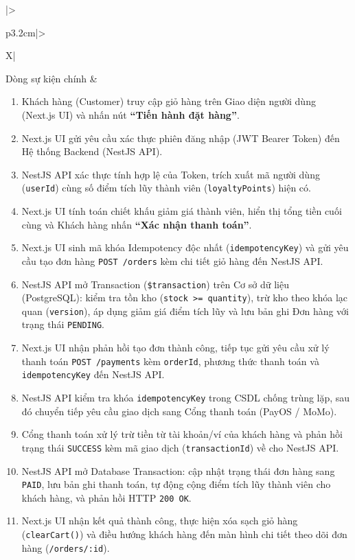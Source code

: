 \documentclass[12pt,a4paper]{article}
\begin{document}
\begin{center}
\begin{xltabular}{\textwidth}{|>{\bfseries\raggedright\arraybackslash}p{3.2cm}|>{\raggedright\arraybackslash}X|}
Dòng sự kiện chính & 
\begin{enumerate}[leftmargin=*,itemsep=2pt,topsep=2pt,parsep=0pt,partopsep=0pt]
    \item Khách hàng (Customer) truy cập giỏ hàng trên Giao diện người dùng (Next.js UI) và nhấn nút \textbf{``Tiến hành đặt hàng''}.
    \item Next.js UI gửi yêu cầu xác thực phiên đăng nhập (JWT Bearer Token) đến Hệ thống Backend (NestJS API).
    \item NestJS API xác thực tính hợp lệ của Token, trích xuất mã người dùng (\texttt{userId}) cùng số điểm tích lũy thành viên (\texttt{loyaltyPoints}) hiện có.
    \item Next.js UI tính toán chiết khấu giảm giá thành viên, hiển thị tổng tiền cuối cùng và Khách hàng nhấn \textbf{``Xác nhận thanh toán''}.
    \item Next.js UI sinh mã khóa Idempotency độc nhất (\texttt{idempotencyKey}) và gửi yêu cầu tạo đơn hàng \texttt{POST /orders} kèm chi tiết giỏ hàng đến NestJS API.
    \item NestJS API mở Transaction (\texttt{\$transaction}) trên Cơ sở dữ liệu (PostgreSQL): kiểm tra tồn kho (\texttt{stock >= quantity}), trừ kho theo khóa lạc quan (\texttt{version}), áp dụng giảm giá điểm tích lũy và lưu bản ghi Đơn hàng với trạng thái \texttt{PENDING}.
    \item Next.js UI nhận phản hồi tạo đơn thành công, tiếp tục gửi yêu cầu xử lý thanh toán \texttt{POST /payments} kèm \texttt{orderId}, phương thức thanh toán và \texttt{idempotencyKey} đến NestJS API.
    \item NestJS API kiểm tra khóa \texttt{idempotencyKey} trong CSDL chống trùng lặp, sau đó chuyển tiếp yêu cầu giao dịch sang Cổng thanh toán (PayOS / MoMo).
    \item Cổng thanh toán xử lý trừ tiền từ tài khoản/ví của khách hàng và phản hồi trạng thái \texttt{SUCCESS} kèm mã giao dịch (\texttt{transactionId}) về cho NestJS API.
    \item NestJS API mở Database Transaction: cập nhật trạng thái đơn hàng sang \texttt{PAID}, lưu bản ghi thanh toán, tự động cộng điểm tích lũy thành viên cho khách hàng, và phản hồi HTTP \texttt{200 OK}.
    \item Next.js UI nhận kết quả thành công, thực hiện xóa sạch giỏ hàng (\texttt{clearCart()}) và điều hướng khách hàng đến màn hình chi tiết theo dõi đơn hàng (\texttt{/orders/:id}).
\end{enumerate} \\

\end{xltabular}
\end{center}
\end{document}
